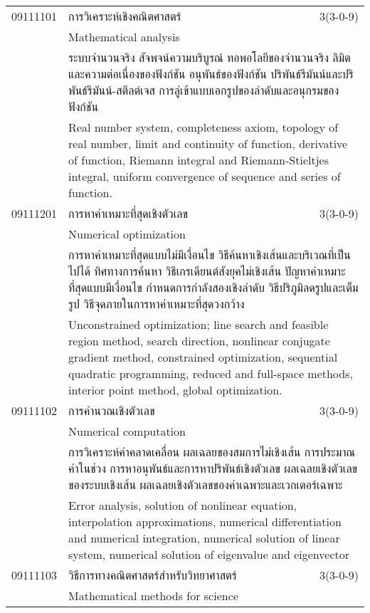 \begin{longtable}{p{}p{}r{}}
09111101 & การวิเคราะห์เชิงคณิตศาสตร์ & 3(3-0-9)\\
 & Mathematical analysis & \\[1mm]
&  \multicolumn{2}{p{0.75\textwidth}}{ระบบจำนวนจริง สัจพจน์ความบริบูรณ์ ทอพอโลยีของจำนวนจริง ลิมิตและความต่อเนื่องของฟังก์ชัน อนุพันธ์ของฟังก์ชัน ปริพันธ์รีมันน์และปริพันธ์รีมันน์-สตีลต์เจส การลู่เข้าแบบเอกรูปของลำดับและอนุกรมของฟังก์ชัน} \\
&  \multicolumn{2}{p{0.75\textwidth}}{Real number system, completeness axiom, topology of real number, limit and continuity of function, derivative of function, Riemann integral and Riemann-Stieltjes integral, uniform convergence of sequence and series of function.} \\[6mm]
09111201 & การหาค่าเหมาะที่สุดเชิงตัวเลข & 3(3-0-9)\\
 & Numerical optimization & \\[1mm]
&  \multicolumn{2}{p{0.75\textwidth}}{การหาค่าเหมาะที่สุดแบบไม่มีเงื่อนไข วิธีค้นหาเชิงเส้นและบริเวณที่เป็นไปได้ ทิศทางการค้นหา วิธีเกรเดียนต์สังยุคไม่เชิงเส้น ปัญหาค่าเหมาะที่สุดแบบมีเงื่อนไข กำหนดการกำลังสองเชิงลำดับ วิธีปริภูมิลดรูปและเต็มรูป วิธีจุดภายในการหาค่าเหมาะที่สุดวงกว้าง} \\
&  \multicolumn{2}{p{0.75\textwidth}}{Unconstrained optimization; line search and feasible region method, search direction, nonlinear conjugate gradient method, constrained optimization, sequential quadratic programming, reduced and full-space methods, interior point method, global optimization.} \\[6mm]
09111102 & การคำนวณเชิงตัวเลข & 3(3-0-9)\\
 & Numerical computation & \\[1mm]
&  \multicolumn{2}{p{0.75\textwidth}}{การวิเคราะห์ค่าคลาดเคลื่อน ผลเฉลยของสมการไม่เชิงเส้น การประมาณค่าในช่วง การหาอนุพันธ์และการหาปริพันธ์เชิงตัวเลข ผลเฉลยเชิงตัวเลขของระบบเชิงเส้น ผลเฉลยเชิงตัวเลขของค่าเฉพาะและเวกเตอร์เฉพาะ} \\
&  \multicolumn{2}{p{0.75\textwidth}}{Error analysis, solution of nonlinear equation, interpolation approximations, numerical differentiation and numerical integration, numerical solution of linear system, numerical solution of eigenvalue and eigenvector} \\[6mm]
09111103 & วิธีการทางคณิตศาสตร์สำหรับวิทยาศาสตร์ & 3(3-0-9)\\
 & Mathematical methods for science & \\[1mm]

\end{longtable}

